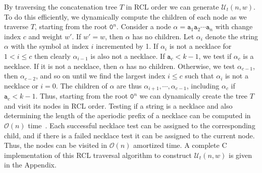 \documentclass[US-letter,USenglish,authorcolumns,autoref]{lipics-v2021}
\renewcommand{\tt} {\mathtt}
\begin{document}
By traversing the concatenation tree $T$ in RCL order we can generate $\mathcal{U}_t(n,w)$.  To do this efficiently, we dynamically compute the children of each node as we traverse $T$, starting from the root $\tt{0}^n$.
%
Consider a node $\alpha = \tt{a}_1\tt{a}_2\cdots \tt{a}_n$ with change index $c$ and weight $w'$.
If $w' = w$, then $\alpha$ has no children.  Let $\alpha_i$ denote the string $\alpha$ with the symbol at index $i$ incremented by 1. If $\alpha_i$ is not a necklace for $1 < i \leq c$ then clearly $\alpha_{i-1}$ is also not a necklace.  If $\tt{a}_c < k-1$, we test if $\alpha_c$ is a necklace. If it is not a necklace, then $\alpha$ has no children.
Otherwise, we test $\alpha_{c-1}$, then $\alpha_{c-2}$, and so on until we find the largest index $i\leq c$ such that $\alpha_i$ is not a necklace or $i=0$.  The children of $\alpha$ are thus $\alpha_{i+1}, \cdots , \alpha_{c-1}$, including $\alpha_c$ if $\tt{a}_c < k-1$.  Thus, starting from the root $\tt{0}^n$ we can dynamically create the tree $T$ and visit its nodes in RCL order.   Testing if a string is a necklace and also determining the length of the aperiodic prefix of a necklace can be computed in $\mathcal{O}(n)$ time~\cite{Booth}. Each successful necklace test can be assigned to the corresponding child, and if there is a failed necklace test it can be assigned to the current node.  Thus, the nodes can be visited in $\mathcal{O}(n)$ amortized time.  
% 
A complete C implementation of this RCL traversal algorithm to construct $\mathcal{U}_t(n,w)$ is given in the Appendix.
\end{document}
